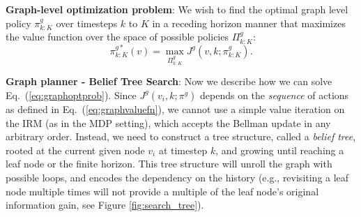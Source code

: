 \documentclass[letterpaper, 10 pt, conference]{ieeeconf}  %
\newcommand{\ph}[1]{{\textbf{#1}:}} %
\newcommand{\note}[1]{{\color{cyan} NOTE: #1 }}
\newcommand{\argmax}{\mathop{\mathrm{argmax}}}
\begin{document}
\ph{Graph-level optimization problem}
We wish to find the optimal graph level policy $\pi^g_{k:K}$ over timesteps $k$ to $K$ in a receding horizon manner that maximizes the value function over the space of possible policies $\Pi^g_{k:K}$:
\begin{equation}
    \pi^{g*}_{k:K}(v)=\max_{\Pi^g_{k:K}} J^g(v,k;\pi^g_{k:K}).
    \label{eq:graphoptprob}
\end{equation}






\ph{Graph planner - Belief Tree Search}
Now we describe how we can solve Eq.~(\ref{eq:graphoptprob}).
Since $J^g(v_i,k; \pi^g)$ depends on the \textit{sequence} of actions as defined in Eq.~(\ref{eq:graphvaluefn}), we cannot use a simple value iteration on the IRM (as in the MDP setting), which accepts the Bellman update in any arbitrary order.
Instead, we need to construct a tree structure, called a \textit{belief tree}, rooted at the current given node $v_i$ at timestep $k$, and growing until reaching a leaf node or the finite horizon.
%
This tree structure will unroll the graph with possible loops, and encodes the dependency on the history
(e.g., revisiting a leaf node multiple times will not provide a multiple of the leaf node's original information gain, see Figure \ref{fig:search_tree}).
\end{document}
